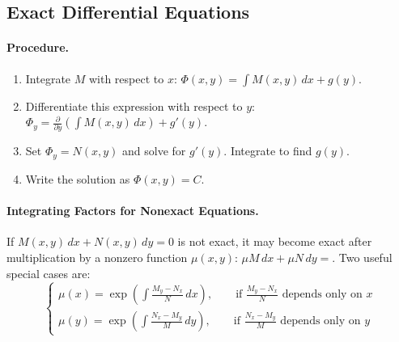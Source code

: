 \documentclass[oneside]{book}
\begin{document}
\subsection{Exact Differential Equations}



\paragraph{Procedure.}

\begin{enumerate}
    \item Integrate $M$ with respect to $x$: $ \Phi(x,y)=\int M(x,y)\,dx+g(y)$.
    \item Differentiate this expression with respect to $y$: $\Phi_y=\frac{\partial}{\partial y}
        \left(\int M(x,y)\,dx\right)+g'(y)$. 
    \item Set $\Phi_y=N(x,y)$ and solve for $g'(y)$. Integrate to find $g(y)$.
    \item Write the solution as $\Phi(x,y)=C$.
\end{enumerate}

\paragraph{Integrating Factors for Nonexact Equations.}
If $M(x,y)\,dx+N(x,y)\,dy=0$ is not exact, it may become exact after multiplication by a nonzero function $\mu(x,y)$: $\mu M\,dx+\mu N\,dy=$. Two useful special cases are:
\[
\begin{cases}
    \mu(x) =\exp\left( \int \frac{M_y-N_x}{N}\,dx \right), \qquad \text{if } \frac{M_y-N_x}{N} \text{ depends only on }x \\
    \mu(y)
    =
    \exp\left(
        \int \frac{N_x-M_y}{M}\,dy
    \right),
    \qquad
    \text{if }
    \frac{N_x-M_y}{M}
    \text{ depends only on }y
\end{cases}
\]
\end{document}
